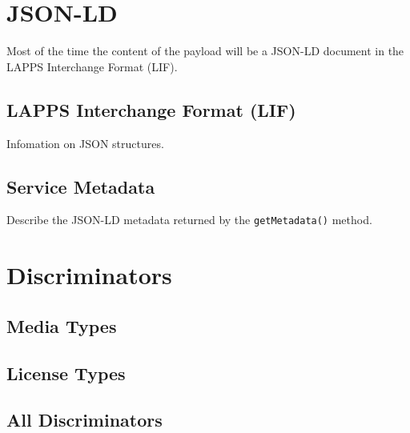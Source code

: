 \documentclass{article}
\newcommand{\lapps}{LAPPS\xspace}
\renewcommand{\tt}[1]{\texttt{#1}}
\begin{document}
\section{JSON-LD}\label{sec:json-ld}

Most of the time the content of the payload will be a JSON-LD document in the LAPPS Interchange Format (LIF).
\subsection{\lapps Interchange Format (LIF)}\label{sec:lif}

Infomation on JSON structures.

\subsection{Service Metadata}\label{sec:metadata}

Describe the JSON-LD metadata returned by the \tt{getMetadata()} method.

\section{Discriminators}\label{sec:discriminators}

\subsection{Media Types}


\subsection{License Types}\label{sub:licenses}


\subsection{All Discriminators}\label{sub:discriminators}





\end{document}
